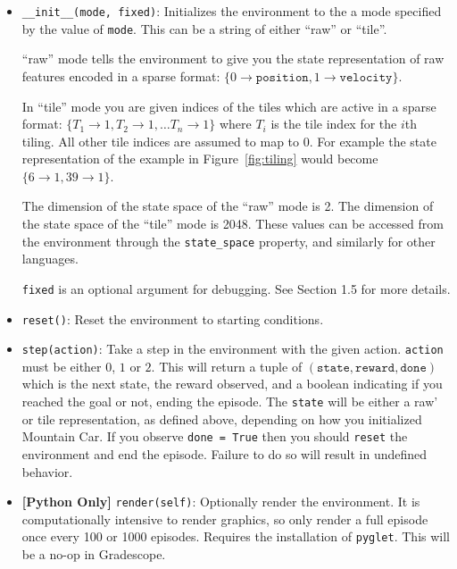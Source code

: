 \documentclass[11pt,addpoints,answers]{exam}
\begin{document}
\begin{itemize}
    \item \texttt{\_\_init\_\_(mode, fixed)}: Initializes the environment to the a mode specified by the value of \texttt{mode}. This can be a string of either ``raw'' or ``tile''. 
    
    ``raw'' mode tells the environment to give you the state representation of raw features encoded in a sparse format: $\{0 \rightarrow \texttt{position}, 1 \rightarrow \texttt{velocity}\}$.
    
    In ``tile'' mode you are given indices of the tiles which are active in a sparse format: $\{T_1 \rightarrow 1, T_2 \rightarrow 1, \ldots T_n \rightarrow 1\}$ where $T_i$ is the tile index for the $i$th tiling. All other tile indices are assumed to map to 0. For example the state representation of the example in Figure~\ref{fig:tiling} would become $\{6 \rightarrow 1, 39 \rightarrow 1\}$.
    
    The dimension of the state space of the ``raw'' mode is 2. The dimension of the state space of the ``tile'' mode is 2048. These values can be accessed from the environment through the \texttt{state\_space} property, and similarly for other languages.
    
    \texttt{fixed} is an optional argument for debugging. See Section 1.5 for more details.
    
    \item \texttt{reset()}: Reset the environment to starting conditions.
    \item \texttt{step(action)}: Take a step in the environment with the given action. \texttt{action} must be either $0$, $1$ or $2$. This will return a tuple of $(\texttt{state}, \texttt{reward}, \texttt{done})$ which is the next state, the reward observed, and a boolean indicating if you reached the goal or not, ending the episode. The \texttt{state} will be either a raw' or tile representation, as defined above, depending on how you initialized Mountain Car.  If you observe \texttt{done = True} then you should \texttt{reset} the environment and end the episode. Failure to do so will result in undefined behavior.
    \item \textbf{[Python Only]} \texttt{render(self)}: Optionally render the environment. It is computationally intensive to render graphics, so only render a full episode once every 100 or 1000 episodes. Requires the installation of \texttt{pyglet}. This will be a no-op in Gradescope.
\end{itemize}
\end{document}

